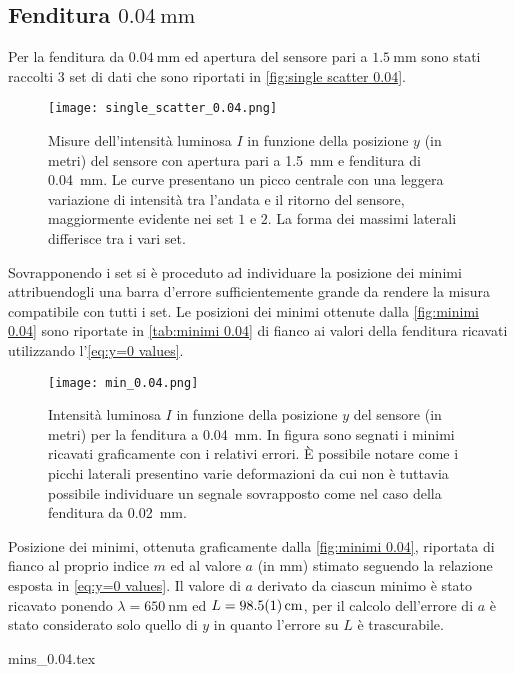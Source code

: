 \documentclass[../main.tex]{subfiles}
\begin{document}
\subsection{Fenditura $\qty{0.04}{\mm}$}

Per la fenditura da $\qty{0.04}{\mm}$ ed apertura del sensore pari a $\qty{1.5}{\mm}$ sono stati raccolti $3$ set di dati che sono riportati in \autoref{fig:single scatter 0.04}.

\begin{figure}[ht!]
    \centering
    \texttt{[image: single\_scatter\_0.04.png]}
    \caption{Misure dell'intensità luminosa $I$ in funzione della posizione $y$ (in metri) del sensore con apertura pari a \qty{1.5}{\mm} e fenditura di \qty{0.04}{\mm}. Le curve presentano un picco centrale con una leggera variazione di intensità tra l'andata e il ritorno del sensore, maggiormente evidente nei set $1$ e $2$. La forma dei massimi laterali differisce tra i vari set.}
    \label{fig:single scatter 0.04}
\end{figure}

Sovrapponendo i set si è proceduto ad individuare la posizione dei minimi attribuendogli una barra d'errore sufficientemente grande da rendere la misura compatibile con tutti i set. Le posizioni dei minimi ottenute dalla \autoref{fig:minimi 0.04} sono riportate in \autoref{tab:minimi 0.04} di fianco ai valori della fenditura ricavati utilizzando l'\autoref{eq:y=0 values}.

\begin{figure}[ht!]
    \centering
    \texttt{[image: min\_0.04.png]}
    \caption{Intensità luminosa $I$ in funzione della posizione $y$ del sensore (in metri) per la fenditura a \qty{0.04}{\mm}. In figura sono segnati i minimi ricavati graficamente con i relativi errori. È possibile notare come i picchi laterali presentino varie deformazioni da cui non è tuttavia possibile individuare un segnale sovrapposto come nel caso della fenditura da \qty{0.02}{\mm}.} %
    \label{fig:minimi 0.04}
\end{figure}

\begin{table}[ht!]
    \centering
    \caption{Posizione dei minimi, ottenuta graficamente dalla \autoref{fig:minimi 0.04}, riportata di fianco al proprio indice $m$ ed al valore $a$ (in $\si{\mm}$) stimato seguendo la relazione esposta in \autoref{eq:y=0 values}. Il valore di $a$ derivato da ciascun minimo è stato ricavato ponendo $\lambda = \qty{650}{\nm}$ ed $L = \qty{98.5+-0.1}{\cm}$, per il calcolo dell'errore di $a$ è stato considerato solo quello di $y$ in quanto l'errore su $L$ è trascurabile.}
    {mins_0.04.tex}
    \label{tab:minimi 0.04}
\end{table}
\end{document}
